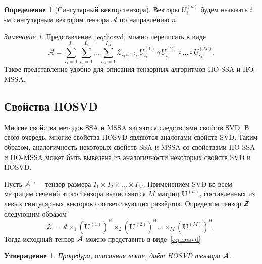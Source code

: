 \documentclass[specialist,
  substylefile=spbu_report.rtx,
subf,href,colorlinks=true, 12pt]{disser}
\theoremstyle{plain}
\newtheorem{statement}{Утверждение}[section]
\theoremstyle{definition}
\newtheorem{definition}{Определение}[section]
\theoremstyle{remark}
\newtheorem{remark}{Замечание}[section]
\begin{document}
\begin{definition}[Сингулярный вектор тензора]
  \label{def:singular-tensor}
  Векторы $U_i^{(n)}$ будем называть $i$-м сингулярным вектором
  тензора $\mathcal A$ по направлению $n$.
\end{definition}
\begin{remark}
  Представление~\eqref{eq:hosvd} можно переписать в виде
  \begin{equation}
    \mathcal{A}=\sum_{i_1=1}^{I_1} \sum_{i_2=1}^{I_2}\ldots
    \sum_{i_M=1}^{I_M} \mathcal{Z}_{i_1 i_2 \ldots i_M}
    U^{(1)}_{i_1} \circ U^{(2)}_{i_2} \circ \ldots\circ
    U^{(M)}_{i_M}.\label{eq:sum-hosvd}
  \end{equation}
  Такое представление удобно для описания тензорных алгоритмов HO-SSA
  и HO-MSSA\@.
\end{remark}

\subsection{Свойства HOSVD}\label{subsec:hosvd-properties}
Многие свойства методов SSA и MSSA являются следствиями свойств SVD\@.
В свою очередь, многие свойства HOSVD являются аналогами свойств SVD\@.
Таким образом, аналогичность некоторых свойств SSA и MSSA со
свойствами HO-SSA и HO-MSSA
может быть выведена из аналогичности некоторых свойств SVD и HOSVD\@.

Пусть $\mathcal{A}$ "--- тензор размера $I_1\times I_2\times\ldots\times I_M$.
Применением SVD ко всем матрицам сечений этого тензора вычисляются
$M$ матриц $\mathbf{U}^{(n)}$,
составленных из левых сингулярных векторов соответствующих развёрток.
Определим тензор $\mathcal{Z}$ следующим образом
\[
  \mathcal{Z}=\mathcal{A}\times_1
  \left(\mathbf{U}^{(1)}\right)^\mathrm{H}\times_2
  \left(\mathbf{U}^{(2)}\right)^\mathrm{H}\ldots \times_M
  \left(\mathbf{U}^{(M)}\right)^\mathrm{H},
\]
Тогда исходный тензор $\mathcal{A}$ можно представить в виде~\eqref{eq:hosvd}

\begin{statement}
  Процедура, описанная выше, даёт HOSVD тензора $\mathcal{A}$.
  \label{state:hosvd-to-svd}
\end{statement}
\end{document}
